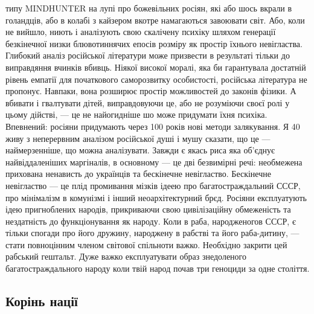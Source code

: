 типу MINDHUNTER на лупі про божевільних росіян, які або шось вкрали в
голандців, або в колабі з кайзером вкотре намагаються завоювати світ.
Або, коли не вийшло, ниють і аналізують свою скалічену психіку шляхом
генерації безкінечної низки блювотиннячих епосів розміру як простір
їхнього невігластва. Глибокий аналіз російської літератури може
призвести в результаті тільки до виправдяння вчинків вбивць. Ніякої
високої моралі, яка би гарантувала достатній рівень емпатії для початкового
саморозвитку особистості, російська література не пропонує. Навпаки, вона
розширює простір можливостей до законів фізики. А вбивати і гвалтувати
дітей, виправдовуючи це, або не розуміючи своєї ролі у цьому дійстві, --- це
не найогидніше шо може придумати їхня психіка. Впевнений: росіяни придумають
через 100 років нові методи залякування. Я 40 живу з неперервним аналізом
російської душі і мушу сказати, що це --- наймерзенніше, що можна аналізувати.
Завжди є якась риса яка об'єднує найвіддаленіших маргіналів, в основному ---
це дві безвимірні речі: необмежена прихована ненависть до українців та
бескінечне невігластво. Бескінечне невігластво --- це плід промивання
мізків ідеею про багатостраждальний СССР, про мінімалізм в комунізмі
і інший неоархітектурний брєд. Росіяни експлуатують ідею пригноблених
народів, прикриваючи свою цивілізаційну обмеженість та нездатність до
функціонування як народу. Коли в раба, народженогов СССР, є тільки спогади
про його дружину, народжену в рабстві та його раба-дитину, --- стати повноцінним
членом світової спільноти важко. Необхідно закрити цей рабський гештальт.
Дуже важко експлуатувати образ знедоленого багатостраждального народу коли
твій народ почав три геноциди за одне століття.

\newpage
\subsection{Корінь нації}

